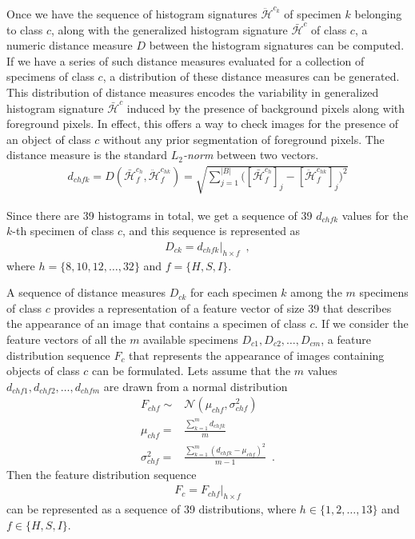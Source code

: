 Once we have the sequence of histogram signatures $\ddot{\mathcal{H}}^{c_{k}}$ of specimen $k$ belonging to class $c$, along with the generalized histogram signature $\bar{\mathcal{H}}^{c}$ of class $c$, a numeric distance measure $D$ between the histogram signatures can be computed. If we have a series of such distance measures evaluated for a collection of specimens of class $c$, a distribution of these distance measures can be generated. This distribution 
of distance measures encodes the variability in generalized histogram signature $\bar{\mathcal{H}}^{c}$ induced by the presence of background pixels along with foreground pixels. In effect, this offers a way to check images for the presence of an object of class $c$ without any prior segmentation of foreground pixels. The distance measure is the standard \emph{$L_2$-norm} between two vectors.
%
\begin{align}	\label{eqn:hist_signature_dist}
 d_{chfk} = D(\bar{\mathcal{H}}^{c_{h}}_f, \ddot{\mathcal{H}}^{c_{hk}}_f) 
 = \sqrt{\sum_{j=1}^{|B|}\Bigg(\left[\bar{\mathcal{H}}^{c_{h}}_f\right]_j
 -\left[\ddot{\mathcal{H}}^{c_{hk}}_f\right]_j\Bigg)^2}
\end{align}

Since there are 39 histograms in total, we get a sequence of 39 $d_{chfk}$ values for the $k$-th specimen of class $c$, and this sequence is represented as
%
\begin{align}	\label{eqn:dist_sequence}
 D_{ck}=d_{chfk}\Big|_{h\times f}\enspace ,
\end{align}
%
where $h=\{8,10,12, \ldots,32\}$ and $f=\{H,S,I\}$.

A sequence of distance measures $D_{ck}$ for each specimen $k$ among the $m$ specimens of class $c$ provides a representation of a feature vector of size 39 that describes the appearance of an image that contains a specimen of class $c$. If we consider the feature vectors of all the $m$ available specimens $D_{c1},D_{c2},\ldots,D_{cm}$, a feature distribution sequence $F_c$ that represents the appearance of images containing objects of class $c$ can be formulated. Lets assume that the $m$ values $d_{chf1}, d_{chf2},\ldots,d_{chfm}$ are drawn from a normal distribution 
%
\begin{align}
 F_{chf}\sim &\mathcal{N}(\mu_{chf},\sigma^2_{chf})\label{eqn:normal_distr}\\
 \mu_{chf}= &\frac{\sum_{k=1}^m d_{chfk}}{m}\label{eqn:normal_mean}\\
 \sigma^2_{chf}= &\frac{\sum_{k=1}^m (d_{chfk}-\mu_{chf})^2}{m-1}\label{eqn:normal_stddev}\enspace .
\end{align}
%
Then the feature distribution sequence
\begin{align}	\label{eqn:feat_distribution}
 F_c=F_{chf}\Big|_{h \times f}
\end{align}
can be represented as a sequence of 39 distributions,
where $h\in\{1,2,\ldots,13\}$ and $f\in\{H,S,I\}$. 

